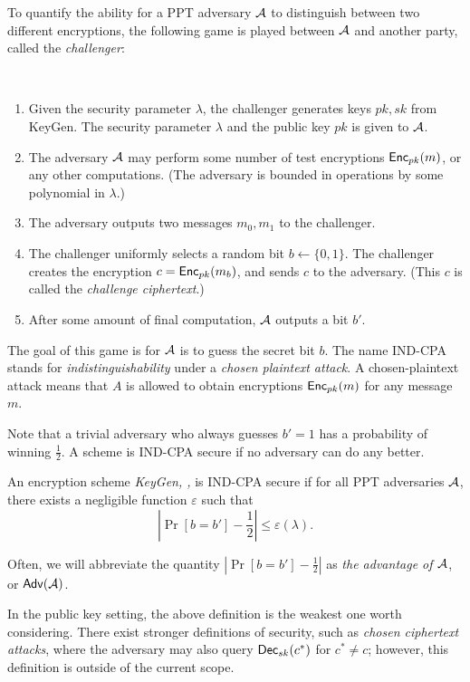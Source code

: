 	To quantify the ability for a PPT adversary $\mathcal{A}$ to distinguish between two different encryptions, the following game is played between $\mathcal{A}$ and another party, called the \textit{challenger}:
	\begin{definition}
	\ \\
	\begin{enumerate}
	\item Given the security parameter $\lambda$, the challenger generates keys $pk, sk$ from {\sf KeyGen}. The security parameter $\lambda$ and the public key $pk$ is given to $\mathcal{A}$.
	\item The adversary $\mathcal{A}$ may perform some number of test encryptions ${\sf Enc}_{pk}(m)$, or any other computations. (The adversary is bounded in operations by some polynomial in $\lambda$.)
	\item The adversary outputs two messages $m_0, m_1$ to the challenger.
	\item The challenger uniformly selects a random bit $b \leftarrow \{0, 1\}.$ The challenger creates the encryption $c = {\sf Enc}_{pk}(m_b)$, and sends $c$ to the adversary. (This $c$ is called the \emph{challenge ciphertext}.)
	\item After some amount of final computation, $\mathcal{A}$ outputs a bit $b'$.
	\end{enumerate}
	\end{definition}

	The goal of this game is for $\mathcal{A}$ is to guess the secret bit $b$. The name IND-CPA stands for \textit{indistinguishability} under a \textit{chosen plaintext attack}. A chosen-plaintext attack means that $A$ is allowed to obtain encryptions ${\sf Enc}_{pk}(m)$ for any message $m$.

	Note that a trivial adversary who always guesses $b' = 1$ has a probability of winning $\frac{1}{2}$. A scheme is IND-CPA secure if no adversary can do any better.

	\begin{definition} An encryption scheme \textit{\sf KeyGen, \Enc, \Dec} is IND-CPA secure if for all PPT adversaries $\mathcal{A}$, there exists a negligible function $\varepsilon$ such that
	\[|\Pr[b = b'] - \frac{1}{2}| \leq \varepsilon(\lambda).\]
	\end{definition}

	Often, we will abbreviate the quantity $|\Pr[b = b'] - \frac{1}{2}|$ as \emph{the advantage of $\mathcal{A}$}, or $\sf Adv(\mathcal{A})$.

	In the public key setting, the above definition is the weakest one worth considering. There exist stronger definitions of security, such as \textit{chosen ciphertext attacks}, where the adversary may also query ${\sf Dec}_{sk}(c^*)$ for $c^* \not = c$; however, this definition is outside of the current scope.

